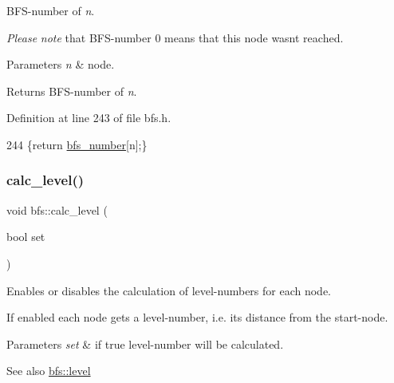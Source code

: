 B\+F\+S-\/number of {\itshape n}. 

{\itshape Please} {\itshape note} that B\+F\+S-\/number 0 means that this node wasn\textquotesingle{}t reached.


\begin{DoxyParams}{Parameters}
{\em n} & node. \\
\hline
\end{DoxyParams}
\begin{DoxyReturn}{Returns}
B\+F\+S-\/number of {\itshape n}. 
\end{DoxyReturn}


Definition at line 243 of file bfs.\+h.


\begin{DoxyCode}
244     \{\textcolor{keywordflow}{return} \mbox{\hyperlink{classbfs_a59d0c5c5ad2715776b20b1aec03dbc3a}{bfs\_number}}[n];\}
\end{DoxyCode}
\mbox{\label{classbfs_a491515da4eb8efca0be4fef0df350a8e}} 
\subsubsection{\texorpdfstring{calc\+\_\+level()}{calc\_level()}\hspace{0.1cm}{\footnotesize\ttfamily [1/2]}}
{\footnotesize\ttfamily void bfs\+::calc\+\_\+level (\begin{DoxyParamCaption}\item[{bool}]{set }\end{DoxyParamCaption})\hspace{0.3cm}{\ttfamily [inherited]}}



Enables or disables the calculation of level-\/numbers for each node. 

If enabled each node gets a level-\/number, i.\+e. its distance from the start-\/node.


\begin{DoxyParams}{Parameters}
{\em set} & if true level-\/number will be calculated. \\
\hline
\end{DoxyParams}
\begin{DoxySeeAlso}{See also}
\mbox{\hyperlink{classbfs_ac0158a0453fb17a89be4049d21db56b1}{bfs\+::level}} 
\end{DoxySeeAlso}


